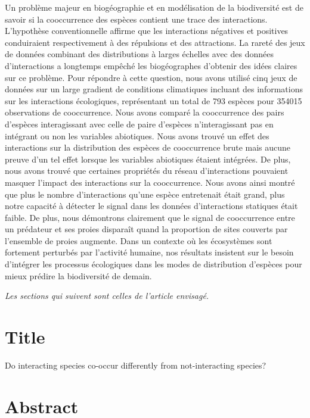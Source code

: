 Un problème majeur en biogéographie et en modélisation de la biodiversité
est de savoir si la cooccurrence des espèces contient une trace des
interactions. L'hypothèse conventionnelle affirme que les interactions
négatives et positives conduiraient respectivement à des répulsions et
des attractions. La rareté des jeux de données combinant des distributions
à larges échelles avec des données d'interactions a longtemps empêché
les biogéographes d'obtenir des idées claires sur ce problème. Pour répondre
à cette question, nous avons utilisé cinq jeux de données sur un large
gradient de conditions climatiques incluant des informations sur les interactions écologiques,
représentant un total de 793 espèces pour 354015 observations de cooccurrence.
Nous avons comparé la cooccurrence des pairs d'espèces interagissant avec
celle de paire d'espèces n'interagissant pas en intégrant ou non les
variables abiotiques. Nous avons trouvé un effet des interactions sur la
distribution des espèces de cooccurrence brute mais aucune preuve d'un tel
effet lorsque les variables abiotiques étaient intégrées. De plus, nous avons
trouvé que certaines propriétés du réseau d'interactions pouvaient masquer l'impact
des interactions sur la cooccurrence. Nous avons ainsi montré que plus le nombre
d'interactions qu'une espèce entretenait était grand, plus notre capacité
à détecter le signal dans les données d'interactions statiques était faible.
De plus, nous démontrons clairement que le signal de cooccurrence entre un
prédateur et ses proies disparaît quand la proportion de sites couverts par
l'ensemble de proies augmente. Dans un contexte où les écosystèmes sont
fortement perturbés par l'activité humaine, nos résultats insistent
sur le besoin d'intégrer les processus écologiques dans les
modes de distribution d'espèces pour mieux prédire la biodiversité de demain.






\emph{Les sections qui suivent sont celles de l'article envisagé.}


\newpage
\section{Title}\label{title}

Do interacting species co-occur differently from not-interacting
species?

\section{Abstract}\label{abstract}

